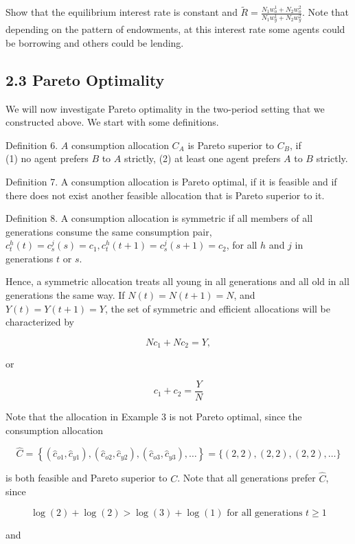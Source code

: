 \documentclass[10pt]{article}
\begin{document}
Show that the equilibrium interest rate is constant and $\tilde{R}=\frac{N_{1} w_{o}^{1}+N_{2} w_{o}^{2}}{N_{1} w_{y}^{1}+N_{2} w_{y}^{2}}$. Note that depending on the pattern of endowments, at this interest rate some agents could be borrowing and others could be lending.

\subsection*{2.3 Pareto Optimality}
We will now investigate Pareto optimality in the two-period setting that we constructed above. We start with some definitions.

Definition 6. $A$ consumption allocation $C_{A}$ is Pareto superior to $C_{B}$, if\\
(1) no agent prefers $B$ to $A$ strictly, (2) at least one agent prefers $A$ to $B$ strictly.

Definition 7. A consumption allocation is Pareto optimal, if it is feasible and if there does not exist another feasible allocation that is Pareto superior to it.

Definition 8. A consumption allocation is symmetric if all members of all generations consume the same consumption pair,\\
$c_{t}^{h}(t)=c_{s}^{j}(s)=c_{1}, c_{t}^{h}(t+1)=c_{s}^{j}(s+1)=c_{2}$, for all $h$ and $j$ in generations $t$ or $s$.

Hence, a symmetric allocation treats all young in all generations and all old in all generations the same way. If $N(t)=N(t+1)=N$, and $Y(t)=Y(t+1)=Y$, the set of symmetric and efficient allocations will be characterized by

$$
N c_{1}+N c_{2}=Y,
$$

or

$$
c_{1}+c_{2}=\frac{Y}{N}
$$

Note that the allocation in Example 3 is not Pareto optimal, since the consumption allocation

$$
\widehat{C}=\left\{\left(\widehat{c}_{o 1}, \widehat{c}_{y 1}\right),\left(\widehat{c}_{o 2}, \widehat{c}_{y 2}\right),\left(\widehat{c}_{o 3}, \widehat{c}_{y 3}\right), \ldots\right\}=\{(2,2),(2,2),(2,2), \ldots\}
$$

is both feasible and Pareto superior to $C$. Note that all generations prefer $\widehat{C}$, since

$$
\log (2)+\log (2)>\log (3)+\log (1) \text { for all generations } t \geq 1
$$

and
\end{document}
